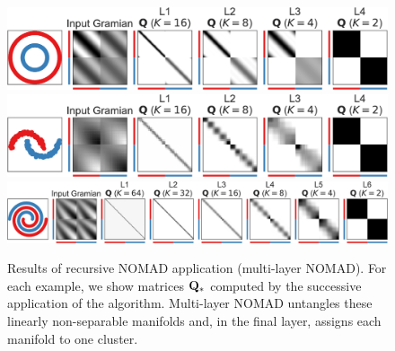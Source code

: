 \documentclass[twoside,11pt]{article}
\begin{document}
\begin{figure}[t]
    \includegraphics[width=.744\linewidth]{multilayer/circles-16-8-4-2}%
    \\[2pt]
    \includegraphics[width=.744\linewidth]{multilayer/moons-16-8-4-2}%
    \\[2pt]
	\includegraphics[width=\linewidth]{multilayer/double_swiss_roll-64-32-16-8-4-2}%
    
	\caption{Results of recursive NOMAD application (multi-layer NOMAD).
    For each example, we show matrices ${\mathbf{Q}}_*$ computed by the successive application of the algorithm. Multi-layer NOMAD untangles these linearly non-separable manifolds and, in the final layer, assigns each manifold to one cluster.}
	\label{fig:multilayer}
\end{figure}

    

\end{document}

